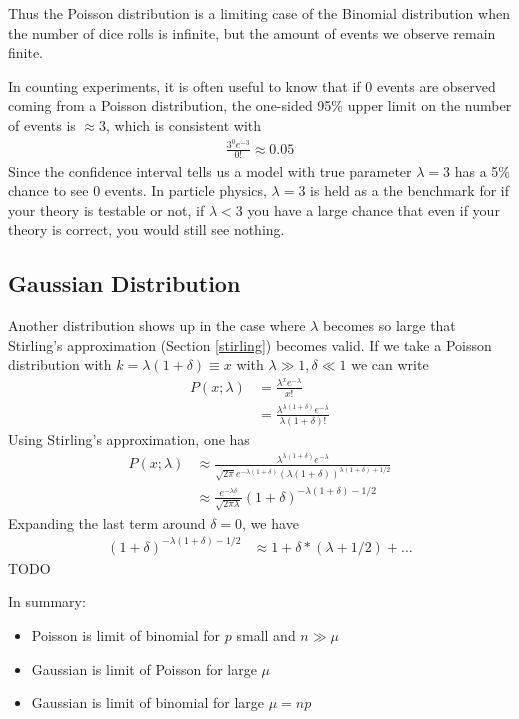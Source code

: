 Thus the Poisson distribution is a limiting case of the Binomial distribution when the number of dice rolls is infinite, but the amount of events we observe remain finite.

In counting experiments, it is often useful to know that if 0 events are observed coming from a Poisson distribution, the one-sided 95\% upper limit on the number of events is $\approx 3$, which is consistent with
\begin{align}
	\frac{3^0e^{-3}}{0!} \approx 0.05
\end{align}
Since the confidence interval tells us a model with true parameter $\lambda=3$ has a 5\% chance to see 0 events. In particle physics, $\lambda=3$ is held as a the benchmark for if your theory is testable or not, if $\lambda < 3$ you have a large chance that even if your theory is correct, you would still see nothing. 



\subsection{Gaussian Distribution}
Another distribution shows up in the case where $\lambda$ becomes so large that Stirling's approximation (Section \ref{stirling}) becomes valid. If we take a Poisson distribution with  $k = \lambda(1+\delta) \equiv x$ with $\lambda \gg 1, \delta \ll 1$ we can write
\begin{align}
	P(x; \lambda) &= \frac{\lambda^xe^{-\lambda}}{x!}\\
	&= \frac{\lambda^{\lambda(1+\delta)}e^{-\lambda}}{\lambda(1+\delta)!}
\end{align}
Using Stirling's approximation, one has
\begin{align}
		P(x; \lambda) &\approx \frac{\lambda^{\lambda(1+\delta)}e^{-\lambda}}{\sqrt{2\pi}e^{-\lambda(1+\delta)}(\lambda(1+\delta))^{\lambda(1+\delta)+1/2}}\\
		&\approx \frac{e^{-\lambda\delta}}{\sqrt{2\pi\lambda}} (1+\delta)^{-\lambda(1+\delta)-1/2}
\end{align}
Expanding the last term around $\delta=0$, we have
\begin{align}
	(1+\delta)^{-\lambda(1+\delta)-1/2} &\approx 1 + \delta*(\lambda+1/2) + \dots
\end{align} 
TODO

In summary:
\begin{itemize}
	\item Poisson is limit of binomial for $p$ small and $n\gg \mu$
	\item Gaussian is limit of Poisson for large $\mu$
	\item Gaussian is limit of binomial for large $\mu=np$
\end{itemize}



